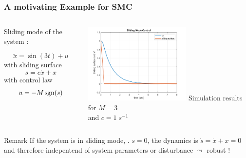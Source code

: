 \begin{frame}
  \frametitle{A motivating Example for SMC}

  
 \begin{columns}

   \begin{example}
     Sliding mode of the system \cite{utkin2020}:

      \begin{equation}
         \ddot x = \sin(3 t) + u 
       \end{equation}
       with sliding surface
       \begin{equation}
        s = c \dot x + x
       \end{equation}
       with control law
       \begin{equation}
         u = -M \sgn(s)
       \end{equation}
    \end{example}   
   \centering
   \includegraphics[height=4cm]{./pictures/SMCutkinRoadmap.pdf}
   Simulation results for $M = 3$ \\ and $c = 1\; \unit{s}^{-1}$
\end{columns}
\end{frame}

\begin{block}{Remark}
  If the system is in sliding mode, \ie. $s=0$, the dynamics is
  $\dot s = \dot x + x =0$ and therefore indepentend of system
  parameters or disturbance $\leadsto$ robust !
\end{block}


